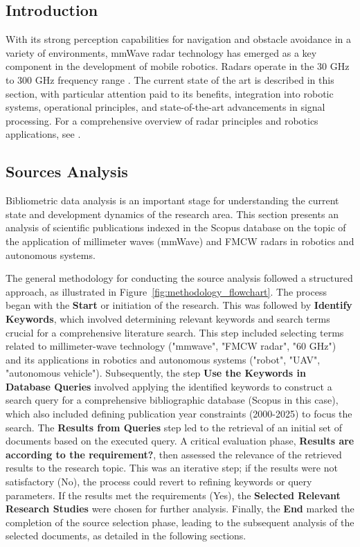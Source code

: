 


\subsection{Introduction}
With its strong perception capabilities for navigation and obstacle avoidance in a variety of environments, mmWave radar technology has emerged as a key component in the development of mobile robotics. Radars operate in the 30 GHz to 300 GHz frequency range \citep{Skolnik2001}. The current state of the art is described in this section, with particular attention paid to its benefits, integration into robotic systems, operational principles, and state-of-the-art advancements in signal processing. For a comprehensive overview of radar principles and robotics applications, see \citep{Skolnik2001, Thrun2005}.

\subsection{Sources Analysis}
Bibliometric data analysis is an important stage for understanding the current state and development dynamics of the research area. This section presents an analysis of scientific publications indexed in the Scopus database on the topic of the application of millimeter waves (mmWave) and FMCW radars in robotics and autonomous systems.

The general methodology for conducting the source analysis followed a structured approach, as illustrated in Figure~\ref{fig:methodology_flowchart}. The process began with the \textbf{Start} or initiation of the research. This was followed by \textbf{Identify Keywords}, which involved determining relevant keywords and search terms crucial for a comprehensive literature search. This step included selecting terms related to millimeter-wave technology ("mmwave", "FMCW radar", "60 GHz") and its applications in robotics and autonomous systems ("robot", "UAV", "autonomous vehicle"). Subsequently, the step \textbf{Use the Keywords in Database Queries} involved applying the identified keywords to construct a search query for a comprehensive bibliographic database (Scopus in this case), which also included defining publication year constraints (2000-2025) to focus the search. The \textbf{Results from Queries} step led to the retrieval of an initial set of documents based on the executed query. A critical evaluation phase, \textbf{Results are according to the requirement?}, then assessed the relevance of the retrieved results to the research topic. This was an iterative step; if the results were not satisfactory (No), the process could revert to refining keywords or query parameters. If the results met the requirements (Yes), the \textbf{Selected Relevant Research Studies} were chosen for further analysis. Finally, the \textbf{End} marked the completion of the source selection phase, leading to the subsequent analysis of the selected documents, as detailed in the following sections.

